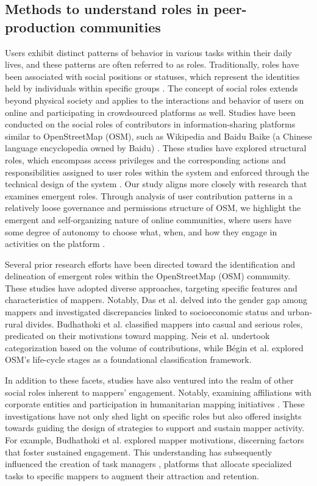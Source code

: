 \documentclass[manuscript,screen,review]{acmart}
\begin{document}
\subsection{Methods to understand roles in peer-production communities}

Users exhibit distinct patterns of behavior in various tasks within their daily lives, and these patterns are often referred to as roles. Traditionally, roles have been associated with social positions or statuses, which represent the identities held by individuals within specific groups \cite{Biddle79}. The concept of social roles extends beyond physical society and applies to the interactions and behavior of users on online and participating in crowdsourced platforms as well. Studies have been conducted on the social roles of contributors in information-sharing platforms similar to OpenStreetMap (OSM), such as Wikipedia and Baidu Baike (a Chinese language encyclopedia owned by Baidu) \cite{Saxena21}. These studies have explored structural roles, which encompass access privileges and the corresponding actions and responsibilities assigned to user roles within the system and enforced through the technical design of the system \cite{Arazy19}. Our study aligns more closely with research that examines emergent roles. Through analysis of user contribution patterns in a relatively loose governance and permissions structure of OSM, we highlight the emergent and self-organizing nature of online communities, where users have some degree of autonomy to choose what, when, and how they engage in activities on the platform \cite{Arazy15, Arazy17, Arazy20}.

Several prior research efforts have been directed toward the identification and delineation of emergent roles within the OpenStreetMap (OSM) community. These studies have adopted diverse approaches, targeting specific features and characteristics of mappers. Notably, Das et al.\cite{Das19} delved into the gender gap among mappers and investigated discrepancies linked to socioeconomic status and urban-rural divides. Budhathoki et al. \cite{Budhathoki13} classified mappers into casual and serious roles, predicated on their motivations toward mapping. Neis et al. \cite{Neis12,Neis17} undertook categorization based on the volume of contributions, while Bégin et al. explored OSM's life-cycle stages as a foundational classification framework\cite{BeginDR18}.

In addition to these facets, studies have also ventured into the realm of other social roles inherent to mappers' engagement. Notably, examining affiliations with corporate entities \cite{Anderson19, Dipto22, Veselovsky22} and participation in humanitarian mapping initiatives \cite{Mahmud22}. These investigations have not only shed light on specific roles but also offered insights towards guiding the design of strategies to support and sustain mapper activity. For example, Budhathoki et al. \cite{Budhathoki13} explored mapper motivations, discerning factors that foster sustained engagement. This understanding has subsequently influenced the creation of task managers \cite{hot_task_manager,maproulette}, platforms that allocate specialized tasks to specific mappers to augment their attraction and retention.
\end{document}
